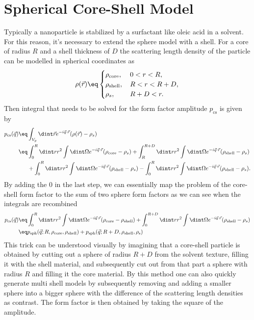 \documentclass[\main/dresen_thesis.tex]{subfiles}
\begin{document}
\section{Spherical Core-Shell Model}\label{ch:appendix:formfactors:sphereCoreshell}
Typically a nanoparticle is stabilized by a surfactant like oleic acid in a solvent. For this reason, it's necessary to extend the sphere model with a shell. For a core of radius $R$ and a shell thickness of $D$ the scattering length density of the particle can be modelled in spherical coordinates as
\begin{align}
  \rho(\vec{r}) \eq \begin{cases}
    \rho_\mathrm{core}, & \, 0 < r < R,\\
    \rho_\mathrm{shell}, & \, R < r < R+D,\\
    \rho_s, & \, R+D < r.\\
  \end{cases}
\end{align}
Then integral that needs to be solved for the form factor amplitude $p_\mathrm{cs}$ is given by
\begin{align}
  p_\mathrm{cs}  (\vec{q})
  \eq& \int_{V_p} \dint \vec{r} e^{-i \vec{q} \cdot \vec{r}} (\rho(\vec{r}) - \rho_s) \\
  \eq& \int_0^R \dint r r^2 \int \dint \Omega e^{-i \vec{q} \cdot \vec{r}} (\rho_\mathrm{core} - \rho_s) + \int_R^{R+D} \dint r r^2 \int \dint \Omega e^{-i \vec{q} \cdot \vec{r}} (\rho_\mathrm{shell} - \rho_s) \\
  & + \int_0^{R} \dint r r^2 \int \dint \Omega e^{-i \vec{q} \cdot \vec{r}} (\rho_\mathrm{shell} - \rho_s) - \int_0^{R} \dint r r^2 \int \dint \Omega e^{-i \vec{q} \cdot \vec{r}} (\rho_\mathrm{shell} - \rho_s).
\end{align}
By adding the 0 in the last step, we can essentially map the problem of the core-shell form factor to the sum of two sphere form factors as we can see when the integrals are recombined
\begin{align}
  p_\mathrm{cs} (\vec{q})
  \eq& \int_0^R \dint r r^2 \int \dint \Omega e^{-i \vec{q} \cdot \vec{r}} (\rho_\mathrm{core} - \rho_\mathrm{shell}) + \int_0^{R+D} \dint r r^2 \int \dint \Omega e^{-i \vec{q} \cdot \vec{r}} (\rho_\mathrm{shell} - \rho_s)\\
  \eq& p_\mathrm{sph} (\vec{q}; R, \rho_\mathrm{core}, \rho_\mathrm{shell}) + p_\mathrm{sph} (\vec{q}; R+D, \rho_\mathrm{shell}, \rho_\mathrm{s})
\end{align}
This trick can be understood visually by imagining that a core-shell particle is obtained by cutting out a sphere of radius $R+D$ from the solvent texture, filling it with the shell material, and subsequently cut out from that part a sphere with radius $R$ and filling it the core material.
By this method one can also quickly generate multi shell models by subsequently removing and adding a smaller sphere into a bigger sphere with the difference of the scattering length densities as contrast.
The form factor is then obtained by taking the square of the amplitude.
\end{document}
